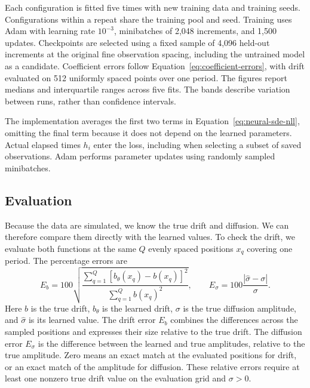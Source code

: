 Each configuration is fitted five times with new training data and training
seeds. Configurations within a repeat share the training pool and seed.
Training uses Adam with learning rate $10^{-3}$, minibatches of 2,048
increments, and 1,500 updates. Checkpoints are selected using a fixed sample
of 4,096 held-out increments at the original fine observation spacing,
including the untrained model as a candidate. Coefficient errors follow
Equation~\eqref{eq:coefficient-errors}, with drift evaluated on 512 uniformly
spaced points over one period. The figures report medians and interquartile
ranges across five fits. The bands describe variation between runs, rather
than confidence intervals.

The implementation averages the first two terms in
Equation~\eqref{eq:neural-sde-nll}, omitting the final term because it does
not depend on the learned parameters. Actual elapsed times $h_i$ enter the
loss, including when selecting a subset of saved observations.
Adam \parencite{KingmaBa2015} performs parameter updates using randomly
sampled minibatches.

\subsection{Evaluation}

Because the data are simulated, we know the true drift and diffusion. We can
therefore compare them directly with the learned values. To check the drift,
we evaluate both functions at the same $Q$ evenly spaced positions $x_q$
covering one period. The percentage errors are
\begin{equation}
    E_b=100\sqrt{
       \frac{\sum_{q=1}^{Q}[b_\theta(x_q)-b(x_q)]^2}
            {\sum_{q=1}^{Q}b(x_q)^2}},\qquad
    E_\sigma=100\frac{|\widehat{\sigma}-\sigma|}{\sigma}.
    \label{eq:coefficient-errors}
\end{equation}
Here $b$ is the true drift, $b_\theta$ is the learned drift, $\sigma$ is the
true diffusion amplitude, and $\widehat{\sigma}$ is its learned value.
The drift error $E_b$ combines the differences across the sampled positions
and expresses their size relative to the true drift. The diffusion error
$E_\sigma$ is the difference between the learned and true amplitudes,
relative to the true amplitude. Zero means an exact match at the evaluated
positions for drift, or an exact match of the amplitude for diffusion.
These relative errors require at least one nonzero true drift value on the
evaluation grid and $\sigma>0$.

